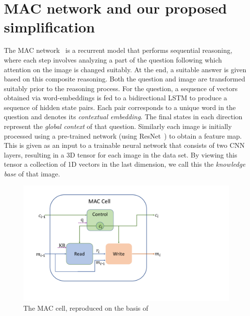 \section{MAC network and our proposed simplification}

The MAC network~\cite{hudson2018compositional} is a recurrent model that performs
sequential reasoning, where each step involves analyzing a part of the question following 
which attention on the image is changed suitably.
At the end, a suitable answer is given based on this composite reasoning.
Both the question and image are transformed suitably prior to the reasoning process. 
For the question, a sequence of vectors obtained via word-embeddings is fed
to a bidirectional LSTM to produce a sequence of hidden state pairs. Each pair 
corresponds to a unique word in the question and denotes its 
\emph{contextual embedding}. The final states in each direction 
represent the \emph{global context} of that question.
Similarly each image is initially processed using a pre-trained network (using ResNet~\cite{he2016resnet}) to obtain a feature map. 
This is given as an input to a trainable neural network that consists of 
two CNN layers, resulting in a 3D tensor for each image in the data set. By viewing this
tensor a collection of 1D vectors in the last dimension, we call this
the \emph{knowledge base} of that image.

\begin{figure}
	\vspace{-15pt}
	\centering
	\includegraphics[width=\textwidth]{img/mac_cell.pdf}
	\caption{The MAC cell, reproduced on the basis of~\cite{hudson2018compositional}}
	\label{fig:mac_cell}
	\vspace{-5pt}
\end{figure}
	
